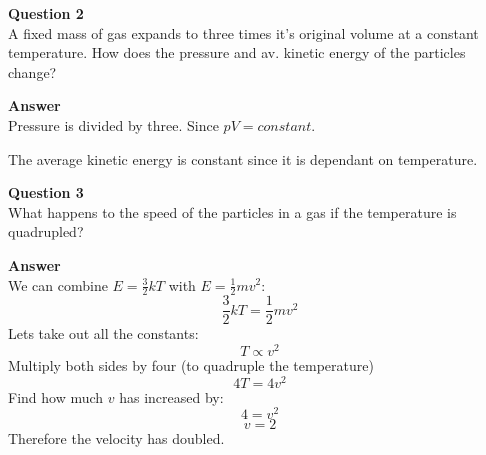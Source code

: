 \documentclass{article}
\begin{document}
\textbf{Question 2}\\
A fixed mass of gas expands to three times it's original volume at a constant temperature. How does the pressure and av. kinetic energy of the particles change?

\textbf{Answer}\\
Pressure is divided by three. Since $pV = constant$.

The average kinetic energy is constant since it is dependant on temperature.

\textbf{Question 3}\\
What happens to the speed of the particles in a gas if the temperature is quadrupled?

\textbf{Answer}\\
We can combine $E = \frac{3}{2}kT$ with $E = \frac{1}{2}mv^2$:
\[
	\frac{3}{2}kT = \frac{1}{2}mv^2
\]
Lets take out all the constants:
\[
	T \propto v^2
\]
Multiply both sides by four (to quadruple the temperature)
\[
	4T = 4v^2
\]
Find how much $v$ has increased by:
\[
	4 = v^2
\]
\[
		v = 2
\]
Therefore the velocity has doubled.
\end{document}

